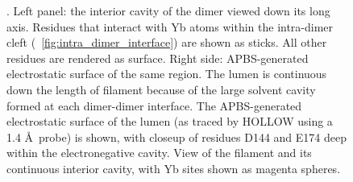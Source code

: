 \begin{figure}[!h]
\begin{conditionalcaption}
\caption[The electronegative lumen within the cardiac calsequestrin filament]{\textbf{\headingsubsectionsix}. \figurepanelcaptiona Left panel: the interior cavity of the dimer viewed down its long axis. Residues that interact with Yb atoms within the intra-dimer cleft (\maintextfigure~\ref{fig:intra_dimer_interface}) are shown as sticks. All other residues are rendered as surface. Right side: APBS-generated electrostatic surface of the same region. \figurepanelcaptionb The lumen is continuous down the length of filament because of the large solvent cavity formed at each dimer-dimer interface. The APBS-generated electrostatic surface of the lumen (as traced by HOLLOW using a 1.4 \AA\ probe) is shown, with closeup of residues D144 and E174 deep within the electronegative cavity. \figurepanelcaptionc View of the filament and its continuous interior cavity, with Yb sites shown as magenta spheres.}
\label{fig:filament_cavity}
\end{conditionalcaption}
\end{figure}